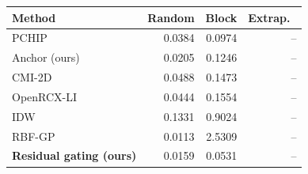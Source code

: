 \small
\begin{tabular}{lrrr}\toprule
Method & Random & Block & Extrap.\ \\\midrule
PCHIP & 0.0384 & 0.0974 & -- \\
Anchor (ours) & 0.0205 & 0.1246 & -- \\
CMI-2D & 0.0488 & 0.1473 & -- \\
OpenRCX-LI & 0.0444 & 0.1554 & -- \\
IDW & 0.1331 & 0.9024 & -- \\
RBF-GP & 0.0113 & 2.5309 & -- \\
\textbf{Residual gating (ours)} & 0.0159 & 0.0531 & -- \\
\bottomrule\end{tabular}
